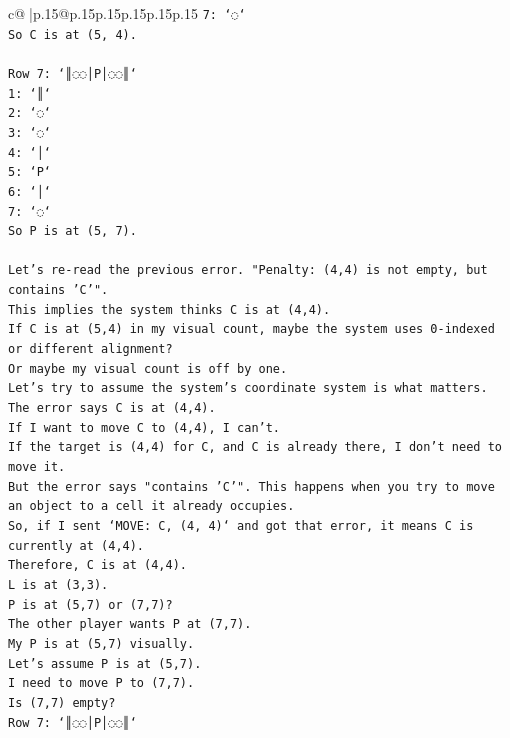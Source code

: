 \documentclass{article}
\begin{document}
{\begin{supertabular}{c@{$\;$}|p{.15\linewidth}@{}p{.15\linewidth}p{.15\linewidth}p{.15\linewidth}p{.15\linewidth}p{.15\linewidth}}
{{{\texttt{7: `◌`} \\
\texttt{So C is at (5, 4).} \\
\\ 
\texttt{Row 7: `║◌◌│P│◌◌║`} \\
\texttt{1: `║`} \\
\texttt{2: `◌`} \\
\texttt{3: `◌`} \\
\texttt{4: `│`} \\
\texttt{5: `P`} \\
\texttt{6: `│`} \\
\texttt{7: `◌`} \\
\texttt{So P is at (5, 7).} \\
\\ 
\texttt{Let's re{-}read the previous error. "Penalty: (4,4) is not empty, but contains 'C'".} \\
\texttt{This implies the system thinks C is at (4,4).} \\
\texttt{If C is at (5,4) in my visual count, maybe the system uses 0{-}indexed or different alignment?} \\
\texttt{Or maybe my visual count is off by one.} \\
\texttt{Let's try to assume the system's coordinate system is what matters.} \\
\texttt{The error says C is at (4,4).} \\
\texttt{If I want to move C to (4,4), I can't.} \\
\texttt{If the target is (4,4) for C, and C is already there, I don't need to move it.} \\
\texttt{But the error says "contains 'C'". This happens when you try to move an object to a cell it already occupies.} \\
\texttt{So, if I sent `MOVE: C, (4, 4)` and got that error, it means C is currently at (4,4).} \\
\texttt{Therefore, C is at (4,4).} \\
\texttt{L is at (3,3).} \\
\texttt{P is at (5,7) or (7,7)?} \\
\texttt{The other player wants P at (7,7).} \\
\texttt{My P is at (5,7) visually.} \\
\texttt{Let's assume P is at (5,7).} \\
\texttt{I need to move P to (7,7).} \\
\texttt{Is (7,7) empty?} \\
\texttt{Row 7: `║◌◌│P│◌◌║`} \\
}}}
\end{supertabular}}
\end{document}
